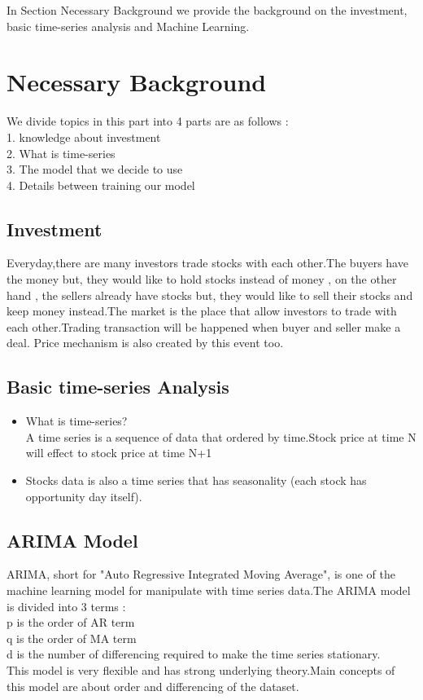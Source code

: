 \documentclass{article}
\begin{document}
In Section Necessary Background we provide the background on the investment, basic time-series analysis and Machine Learning.



\section{Necessary Background}
\label{sec:background}


We divide topics in this part into 4 parts are as follows :\\
1. knowledge about investment\\
2. What is time-series\\
3. The model that we decide to use\\
4. Details between training our model


\subsection{Investment}
Everyday,there are many investors trade stocks with each other.The buyers have the money but, they would like to hold stocks instead of money , on the other hand , the sellers already have stocks but, they would like to sell their stocks and keep money instead.The market is the place that allow investors to trade with each other.Trading transaction will be happened when buyer and seller make a deal.
Price mechanism is also created by this event too.

\subsection{Basic time-series Analysis}
\begin{itemize}
\item What is time-series?\\A time series is a sequence of data that ordered by time.Stock price at time N will 
effect to stock price at time N+1
\item Stocks data is also a time series that has seasonality (each stock has opportunity day itself).
\end{itemize}


\subsection{ARIMA Model}
ARIMA, short for "Auto Regressive Integrated Moving Average", is one of the machine learning model for manipulate with time series data.The ARIMA model is divided into 3 terms :\\p is the order of AR term\\q is the order of MA term\\d is the number of differencing required to make the time series stationary.\\This model is very flexible and has strong underlying theory.Main concepts of this model are about order and differencing of the dataset. 
\end{document}
